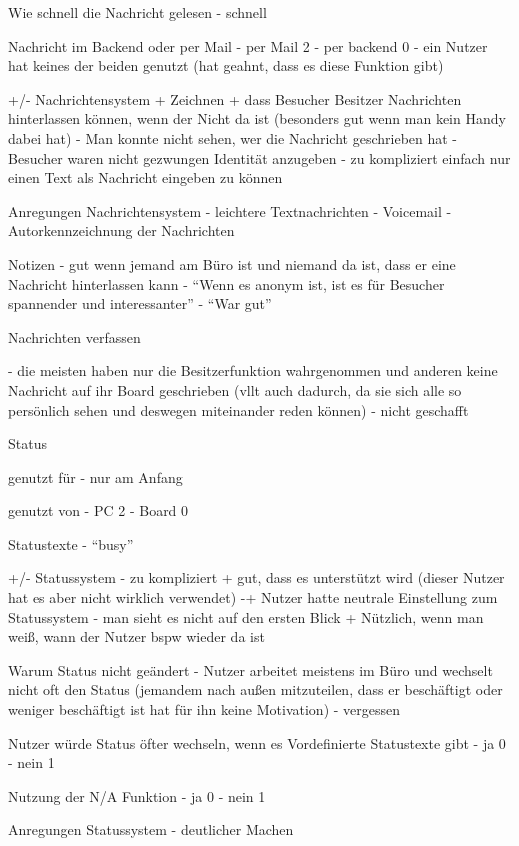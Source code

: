 Wie schnell die Nachricht gelesen
- schnell

Nachricht im Backend oder per Mail
- per Mail  2
- per backend 0
- ein Nutzer hat keines der beiden genutzt (hat geahnt, dass es diese Funktion gibt)

+/- Nachrichtensystem
+ Zeichnen
+ dass Besucher Besitzer Nachrichten hinterlassen können, wenn der Nicht da ist (besonders gut wenn man kein Handy dabei hat)
- Man konnte nicht sehen, wer die Nachricht geschrieben hat
- Besucher waren nicht gezwungen Identität anzugeben
- zu kompliziert einfach nur einen Text als Nachricht eingeben zu können

Anregungen Nachrichtensystem
- leichtere Textnachrichten
- Voicemail
- Autorkennzeichnung der Nachrichten

Notizen
- gut wenn jemand am Büro ist und niemand da ist, dass er eine Nachricht hinterlassen kann
- ``Wenn es anonym ist, ist es für Besucher spannender und interessanter''
- ``War gut''

Nachrichten verfassen

- die meisten haben nur die Besitzerfunktion wahrgenommen und anderen keine Nachricht auf ihr Board geschrieben
  (vllt auch dadurch, da sie sich alle so persönlich sehen und deswegen miteinander reden können)
- nicht geschafft

Status

genutzt für
- nur am Anfang

genutzt von
- PC 2
- Board 0

Statustexte
- ``busy''

+/- Statussystem
- zu kompliziert
+ gut, dass es unterstützt wird (dieser Nutzer hat es aber nicht wirklich verwendet)
-+ Nutzer hatte neutrale Einstellung zum Statussystem
- man sieht es nicht auf den ersten Blick
+ Nützlich, wenn man weiß, wann der Nutzer bspw wieder da ist

Warum Status nicht geändert
- Nutzer arbeitet meistens im Büro und wechselt nicht oft den Status (jemandem nach außen mitzuteilen, dass er beschäftigt oder weniger beschäftigt ist hat für ihn keine Motivation)
- vergessen

Nutzer würde Status öfter wechseln, wenn es Vordefinierte Statustexte gibt
- ja 0
- nein 1

Nutzung der N/A Funktion
- ja 0
- nein 1

Anregungen Statussystem
- deutlicher Machen

